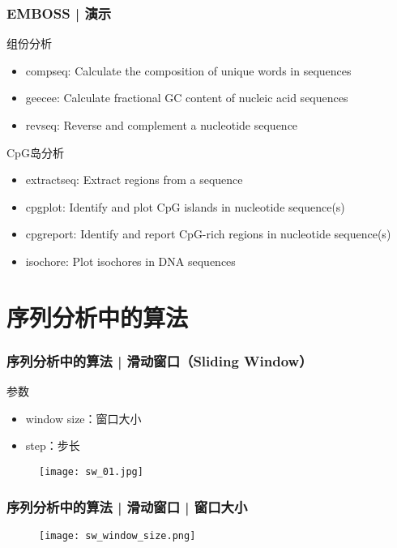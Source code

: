 \begin{frame}
  \frametitle{EMBOSS | 演示}
  \begin{block}{组份分析}
  \begin{itemize}
    \item compseq: Calculate the composition of unique words in sequences
    \item geecee: Calculate fractional GC content of nucleic acid sequences
    \item revseq: Reverse and complement a nucleotide sequence
  \end{itemize}
  \end{block}
  \begin{block}{CpG岛分析}
  \begin{itemize}
    \item extractseq: Extract regions from a sequence
    \item cpgplot: Identify and plot CpG islands in nucleotide sequence(s)
    \item cpgreport: Identify and report CpG-rich regions in nucleotide sequence(s)
    \item isochore: Plot isochores in DNA sequences
  \end{itemize}
\end{block}
\end{frame}

\section{序列分析中的算法}
\begin{frame}
  \frametitle{序列分析中的算法 | 滑动窗口（Sliding Window）}
  \begin{block}{参数}
    \begin{itemize}
      \item window size：窗口大小
      \item step：步长
    \end{itemize}
  \end{block}
  \begin{figure}
    \centering
    \texttt{[image: sw\_01.jpg]}
  \end{figure}
\end{frame}

\begin{frame}
  \frametitle{序列分析中的算法 | 滑动窗口 | 窗口大小}
  \begin{figure}
    \centering
    \texttt{[image: sw\_window\_size.png]}
  \end{figure}
\end{frame}

